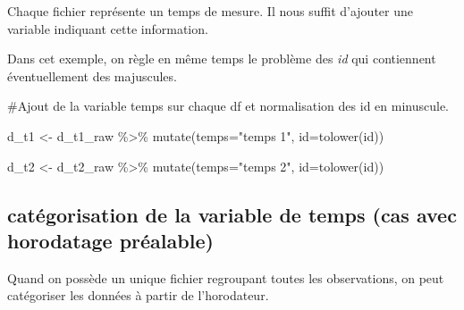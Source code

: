 \documentclass[
  letterpaper,
  DIV=11,
  numbers=noendperiod]{scrreprt}
\newenvironment{Shaded}{\begin{snugshade}}{\end{snugshade}}
\newcommand{\AttributeTok}[1]{\textcolor[rgb]{0.40,0.45,0.13}{#1}}
\newcommand{\CommentTok}[1]{\textcolor[rgb]{0.37,0.37,0.37}{#1}}
\newcommand{\FunctionTok}[1]{\textcolor[rgb]{0.28,0.35,0.67}{#1}}
\newcommand{\NormalTok}[1]{\textcolor[rgb]{0.00,0.23,0.31}{#1}}
\newcommand{\OtherTok}[1]{\textcolor[rgb]{0.00,0.23,0.31}{#1}}
\newcommand{\SpecialCharTok}[1]{\textcolor[rgb]{0.37,0.37,0.37}{#1}}
\newcommand{\StringTok}[1]{\textcolor[rgb]{0.13,0.47,0.30}{#1}}
\begin{document}
Chaque fichier représente un temps de mesure. Il nous suffit d'ajouter
une variable indiquant cette information.

Dans cet exemple, on règle en même temps le problème des \emph{id} qui
contiennent éventuellement des majuscules.

\begin{Shaded}
\begin{Highlighting}[]
\CommentTok{\#Ajout de la variable temps sur chaque df et normalisation des id en minuscule.}

\NormalTok{d\_t1 }\OtherTok{\textless{}{-}}\NormalTok{ d\_t1\_raw }\SpecialCharTok{\%\textgreater{}\%} 
  \FunctionTok{mutate}\NormalTok{(}\AttributeTok{temps=}\StringTok{"temps 1"}\NormalTok{,}
         \AttributeTok{id=}\FunctionTok{tolower}\NormalTok{(id)) }

\NormalTok{d\_t2 }\OtherTok{\textless{}{-}}\NormalTok{ d\_t2\_raw }\SpecialCharTok{\%\textgreater{}\%} 
  \FunctionTok{mutate}\NormalTok{(}\AttributeTok{temps=}\StringTok{"temps 2"}\NormalTok{,}
         \AttributeTok{id=}\FunctionTok{tolower}\NormalTok{(id))}
\end{Highlighting}
\end{Shaded}

\hypertarget{catuxe9gorisation-de-la-variable-de-temps-cas-avec-horodatage-pruxe9alable}{%
\subsection{catégorisation de la variable de temps (cas avec horodatage
préalable)}\label{catuxe9gorisation-de-la-variable-de-temps-cas-avec-horodatage-pruxe9alable}}

Quand on possède un unique fichier regroupant toutes les observations,
on peut catégoriser les données à partir de l'horodateur.
\end{document}
